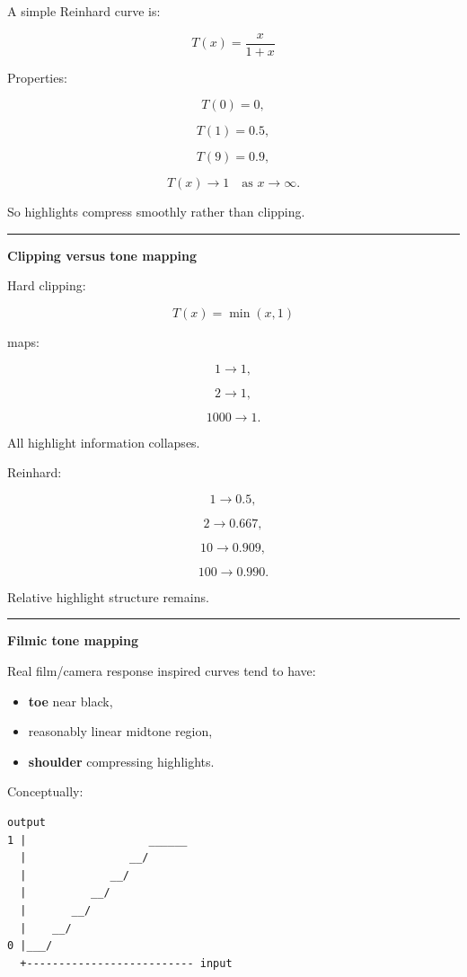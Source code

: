 A simple Reinhard curve is:

\[
\boxed{
T(x)=\frac{x}{1+x}
}
\]

Properties:

\[
T(0)=0,
\]

\[
T(1)=0.5,
\]

\[
T(9)=0.9,
\]

\[
T(x)\rightarrow1
\quad \text{as }x\rightarrow\infty.
\]

So highlights compress smoothly rather than clipping.

\begin{center}\rule{0.5\linewidth}{0.5pt}\end{center}

\textbf{Clipping versus tone mapping}

Hard clipping:

\[
T(x)=\min(x,1)
\]

maps:

\[
1\rightarrow1,
\]

\[
2\rightarrow1,
\]

\[
1000\rightarrow1.
\]

All highlight information collapses.

Reinhard:

\[
1\rightarrow0.5,
\]

\[
2\rightarrow0.667,
\]

\[
10\rightarrow0.909,
\]

\[
100\rightarrow0.990.
\]

Relative highlight structure remains.

\begin{center}\rule{0.5\linewidth}{0.5pt}\end{center}

\textbf{Filmic tone mapping}

Real film/camera response inspired curves tend to have:

\begin{itemize}
\tightlist
\item
  \textbf{toe} near black,
\item
  reasonably linear midtone region,
\item
  \textbf{shoulder} compressing highlights.
\end{itemize}

Conceptually:

\begin{verbatim}
output
1 |                   ______
  |                __/
  |             __/
  |          __/
  |       __/
  |    __/
0 |___/
  +-------------------------- input
\end{verbatim}

